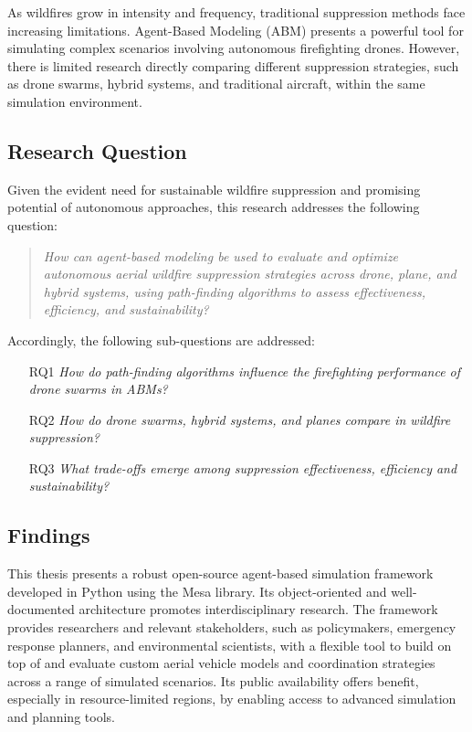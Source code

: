 \documentclass[11pt, a4paper]{article}
\begin{document}
As wildfires grow in intensity and frequency, traditional suppression methods face increasing limitations. Agent-Based Modeling (ABM) presents a powerful tool for simulating complex scenarios involving autonomous firefighting drones. However, there is limited research directly comparing different suppression strategies, such as drone swarms, hybrid systems, and traditional aircraft, within the same simulation environment.

\subsection{Research Question}
Given the evident need for sustainable wildfire suppression and promising potential of autonomous approaches, this research addresses the following question:
\begin{quote}
\emph{How can agent-based modeling be used to evaluate and optimize autonomous aerial wildfire suppression strategies across drone, plane, and hybrid systems, using path-finding algorithms to assess effectiveness, efficiency, and sustainability?}
\end{quote}

\noindent Accordingly, the following sub-questions are addressed: 

\begin{itemize}
    \item[RQ1] \emph{How do path-finding algorithms influence the firefighting performance of drone swarms in ABMs?}
    \item[RQ2] \emph{How do drone swarms, hybrid systems, and planes compare in wildfire suppression?}
    \item[RQ3] \emph{What trade-offs emerge among suppression effectiveness, efficiency and sustainability?}
\end{itemize}

\subsection{Findings}

This thesis presents a robust open-source agent-based simulation framework developed in Python using the Mesa library. Its object-oriented and well-documented architecture promotes interdisciplinary research. The framework provides researchers and relevant stakeholders, such as policymakers, emergency response planners, and environmental scientists, with a flexible tool to build on top of and evaluate custom aerial vehicle models and coordination strategies across a range of simulated scenarios. Its public availability offers benefit, especially in resource-limited regions, by enabling access to advanced simulation and planning tools.
\end{document}
